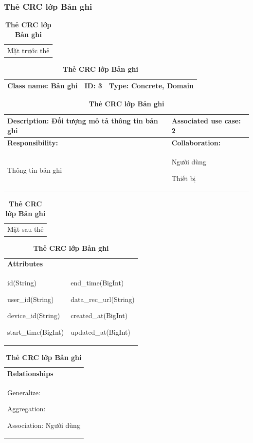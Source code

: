 \subsubsection{Thẻ CRC lớp Bản ghi}
  \begin{table}[H]
    \caption{\bfseries \fontsize{12pt}{0pt}\selectfont Thẻ CRC lớp Bản ghi}
    \centering
    \begin{tabularx}{0.9\textwidth}{X}
      Mặt trước thẻ
    \end{tabularx}
    \begin{tabularx}{0.9\textwidth}{|X|X|X|}
      \hline
      \textbf{Class name:} Bản ghi & \textbf{ID:} 3 & \textbf{Type:} Concrete, Domain \\
      \hline
    \end{tabularx}
    \begin{tabularx}{0.9\textwidth}{|X|X|}
      \textbf{Description:} Đối tượng mô tả thông tin bản ghi & \textbf{Associated use case:} 2 \\
      \hline
      \textbf{Responsibility:} & \textbf{Collaboration:} \\
      Thông tin bản ghi 
      & 
      Người dùng
      
      Thiết bị
      \\
      \hline
    \end{tabularx}
    \begin{tabularx}{0.9\textwidth}{X}
      Mặt sau thẻ
    \end{tabularx}
    \begin{tabularx}{0.9\textwidth}{|X|X|}
      \hline
      \textbf{Attributes} & \\
      id(String) 
      
      user\_id(String)

      device\_id(String)

      start\_time(BigInt)
      & 
      end\_time(BigInt) 
      
      data\_rec\_url(String) 
      
      created\_at(BigInt)

      updated\_at(BigInt)
      \\
      \hline
    \end{tabularx}
    \begin{tabularx}{0.9\textwidth}{|X|}
      \textbf{Relationships} \\
      Generalize:  

      Aggregation:  
      
      Association: Người dùng 
      \\
      \hline
    \end{tabularx}
  \end{table}

